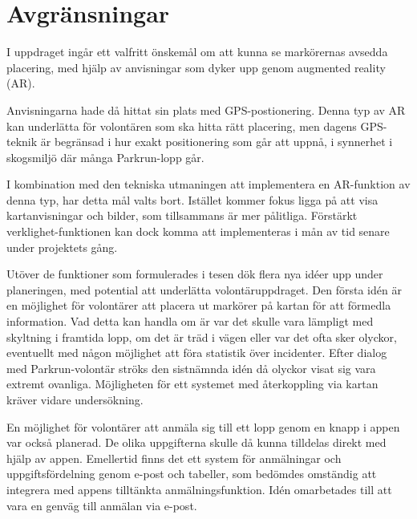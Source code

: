 \section{Avgränsningar}
I uppdraget ingår ett valfritt önskemål om att kunna se markörernas avsedda placering, med hjälp av anvisningar som dyker upp genom augmented reality (AR). 

Anvisningarna hade då hittat sin plats med GPS-postionering.
Denna typ av AR kan underlätta för volontären som ska hitta rätt placering, men dagens GPS-teknik är begränsad i hur exakt positionering som går att uppnå, i synnerhet i skogsmiljö där många Parkrun-lopp går.

I kombination med den tekniska utmaningen att implementera en AR-funktion av denna typ, har detta mål valts bort. Istället kommer fokus ligga på att visa kartanvisningar och bilder, som tillsammans är mer pålitliga. Förstärkt verklighet-funktionen kan dock komma att implementeras i mån av tid senare under projektets gång.

Utöver de funktioner som formulerades i tesen dök flera nya idéer upp under planeringen, med potential att underlätta volontäruppdraget. Den första idén är en möjlighet för volontärer att placera ut markörer på kartan för att förmedla information. Vad detta kan handla om är var det skulle vara lämpligt med skyltning i framtida lopp, om det är träd i vägen eller var det ofta sker olyckor, eventuellt med någon möjlighet att föra statistik över incidenter. Efter dialog med Parkrun-volontär ströks den sistnämnda idén då olyckor visat sig vara extremt ovanliga. Möjligheten för ett systemet med återkoppling via kartan kräver vidare undersökning.

En möjlighet för volontärer att anmäla sig till ett lopp genom en knapp i appen var också planerad. De olika uppgifterna skulle då kunna tilldelas direkt med hjälp av appen. Emellertid finns det ett system för anmälningar och uppgiftsfördelning genom e-post och tabeller, som bedömdes omständig att integrera med appens tilltänkta anmälningsfunktion. Idén omarbetades till att vara en genväg till anmälan via e-post.
